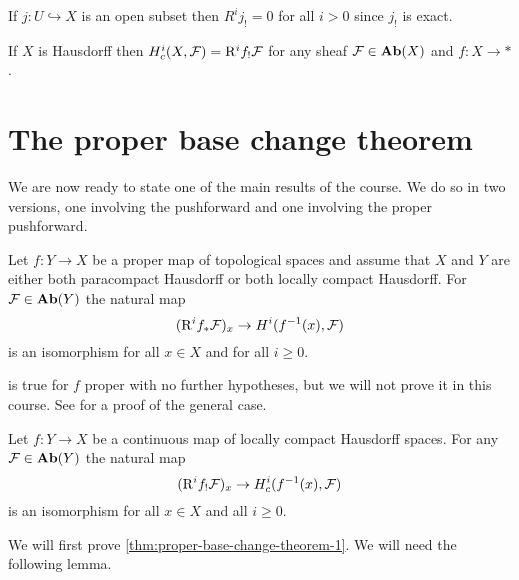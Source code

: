 \begin{exmp}
	If $j\colon U \hookrightarrow X$ is an open subset then $R^ij_! = 0$ for all $i > 0$ since $j_!$ is exact.
\end{exmp}

\begin{exc}
	If $X$ is Hausdorff then $\cohomology^i_c(X, \sh{F}) = \rightderived^i f_!\sh{F}$ for any sheaf $\mathcal{F} \in \operatorname{\mathbf{Ab}}(X)$ and $f\colon X \to *$. 
\end{exc}

\section{The proper base change theorem}
\noindent
We are now ready to state one of the main results of the course. We do so in two versions, one involving the pushforward and one involving the proper pushforward.

\begin{thm}\label{thm:proper-base-change-theorem-1}
	Let $f: Y \to X$ be a proper map of topological spaces and assume that $X$ and $Y$ are either both paracompact Hausdorff or both locally compact Hausdorff. For $\mathcal{F} \in \operatorname{\mathbf{Ab}}(Y)$ the natural map \[
    	(\rightderived^i f_* \sh{F})_x \to \cohomology^i(f^{-1}(x), \sh{F})
    \] is an isomorphism for all $x \in X$ and for all $i \geq 0$. 
\end{thm}

\begin{rmk}
	 is true for $f$ proper with no further hypotheses, but we will not prove it in this course. See \cite[Lemma~\textsc{09v6}]{stacks-project} for a proof of the general case.
\end{rmk}

\begin{thm}\label{thm:proper-base-changed-theorem-2}
	Let $f: Y \to X$ be a continuous map of locally compact Hausdorff spaces. For any $\mathcal{F} \in \operatorname{\mathbf{Ab}}(Y)$ the natural map \[
    	(\rightderived^i f_! \sh{F})_x \to \cohomology^i_c(f^{-1}(x), \sh{F})
    \] is an isomorphism for all $x \in X$ and all $i \geq 0$.
\end{thm}

We will first prove \cref{thm:proper-base-change-theorem-1}. We will need the following lemma.

